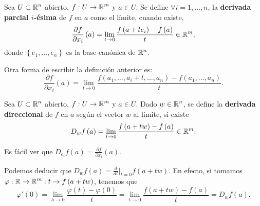 \begin{definition}
	Sea $\displaystyle U \subset \mathbb{R}^{n} $ abierto, $\displaystyle f : U \to \mathbb{R}^{m} $ y $\displaystyle a \in U $. Se define $\displaystyle \forall i = 1, \ldots, n $, la \textbf{derivada parcial $\displaystyle i $-ésima} de $\displaystyle f $ en $\displaystyle a $ como el límite, cuando existe,
	\[\frac{\partial f}{\partial x_{i}}\left(a\right) = \lim_{t \to 0}\frac{f\left(a+t e_{i}\right)-f\left(a\right)}{t} \in \mathbb{R}^{m} ,\]
	donde $\displaystyle \left\{ e_{1}, \ldots, e_{n}\right\}  $ es la base canónica de $\displaystyle \mathbb{R}^{n} $.
\end{definition}
\begin{observation}
Otra forma de escribir la definición anterior es:
\[\frac{\partial f}{\partial x_{i}}\left(a\right) = \lim_{t \to 0}\frac{f\left(a_{1}, \ldots, a_{i}+t, \ldots,a_{n}\right)-f\left(a_{1}, \ldots, a_{n}\right)}{t} .\]
\end{observation}
\begin{definition}
Sea $\displaystyle U \subset \mathbb{R}^{n} $ abierto, $\displaystyle f : U \to \mathbb{R}^{m} $ y $\displaystyle a \in U $. Dado $\displaystyle w \in \mathbb{R}^{n} $, se define la \textbf{derivada direccional} de $\displaystyle f $ en $\displaystyle a $ según el vector $\displaystyle w $ al límite, si existe
\[D_{w}f\left(a\right) = \lim_{t \to 0}\frac{f\left(a+tw\right)-f\left(a\right)}{t} \in \mathbb{R}^{m} .\]
\end{definition}
\begin{observation}
Es fácil ver que $\displaystyle D_{e_{i}}f\left(a\right) = \frac{\partial f}{\partial x_{i}}\left(a\right) $. 
\end{observation}
\begin{observation}
Podemos deducir que $\displaystyle D_{w}f\left(a\right) = \frac{d}{dt}|_{t = 0}f\left(a+tw\right) $. En efecto, si tomamos $\displaystyle \varphi : \mathbb{R} \to \mathbb{R}^{m} : t \to f\left(a + tw\right) $, tenemos que
\[\varphi'\left(0\right) = \lim_{h \to 0}\frac{\varphi\left(t\right)-\varphi\left(0\right)}{t} = \lim_{t \to 0}\frac{f\left(a+tw\right)-f\left(a\right)}{t} = D_{w}f\left(a\right).\]
\end{observation}
